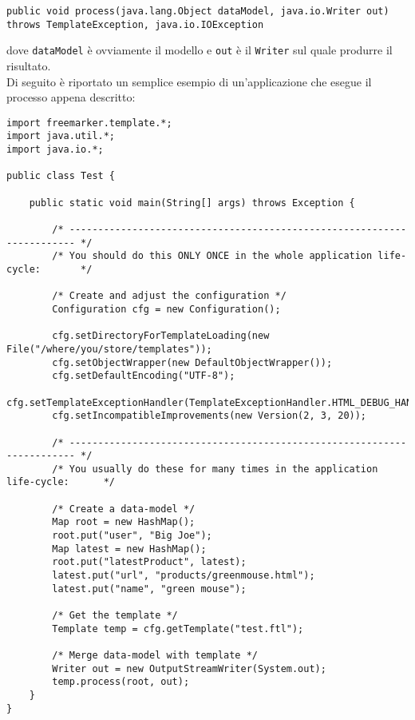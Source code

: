 \begin{lstlisting}
public void process(java.lang.Object dataModel, java.io.Writer out) throws TemplateException, java.io.IOException
\end{lstlisting}

dove \lstinline{dataModel} è ovviamente il modello e \lstinline{out} è il \lstinline{Writer} sul quale produrre il risultato.\\
Di seguito è riportato un semplice esempio di un'applicazione che esegue il processo appena descritto:

\begin{lstlisting}
import freemarker.template.*;
import java.util.*;
import java.io.*;

public class Test {

    public static void main(String[] args) throws Exception {
        
        /* ----------------------------------------------------------------------- */    
        /* You should do this ONLY ONCE in the whole application life-cycle:       */    
    
        /* Create and adjust the configuration */
        Configuration cfg = new Configuration();

        cfg.setDirectoryForTemplateLoading(new File("/where/you/store/templates"));
        cfg.setObjectWrapper(new DefaultObjectWrapper());
        cfg.setDefaultEncoding("UTF-8");
        cfg.setTemplateExceptionHandler(TemplateExceptionHandler.HTML_DEBUG_HANDLER);
        cfg.setIncompatibleImprovements(new Version(2, 3, 20));

        /* ----------------------------------------------------------------------- */    
        /* You usually do these for many times in the application life-cycle:      */    

        /* Create a data-model */
        Map root = new HashMap();
        root.put("user", "Big Joe");
        Map latest = new HashMap();
        root.put("latestProduct", latest);
        latest.put("url", "products/greenmouse.html");
        latest.put("name", "green mouse");

        /* Get the template */
        Template temp = cfg.getTemplate("test.ftl");

        /* Merge data-model with template */
        Writer out = new OutputStreamWriter(System.out);
        temp.process(root, out);
    }
}
\end{lstlisting}

